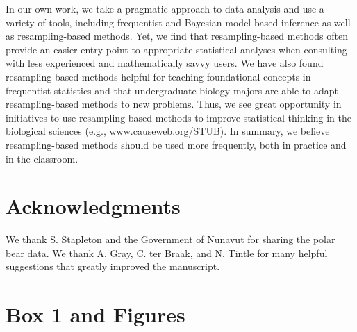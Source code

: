\documentclass[fleqn,10pt]{wlpeerj} %
\begin{document}
In our own work, we take a pragmatic approach to data analysis and use a variety of tools, including frequentist and Bayesian model-based inference as well as resampling-based methods. Yet, we find that resampling-based methods often provide an easier entry point to appropriate statistical analyses when consulting with less experienced and mathematically savvy users. We have also found resampling-based methods helpful for teaching foundational concepts in frequentist statistics and that undergraduate biology majors are able to adapt resampling-based methods to new problems. Thus, we see great opportunity in initiatives to use resampling-based methods to improve statistical thinking in the biological sciences (e.g., www.causeweb.org/STUB). In summary, we believe resampling-based methods should be used more frequently, both in practice and in the classroom.

\hypertarget{acknowledgments}{%
\section*{Acknowledgments}\label{acknowledgments}}

We thank S. Stapleton and the Government of Nunavut for sharing the polar bear data. We thank A. Gray, C. ter Braak, and N. Tintle for many helpful suggestions that greatly improved the manuscript.

\newpage

\hypertarget{box-1-and-figures}{%
\section*{Box 1 and Figures}\label{box-1-and-figures}}
\end{document}
